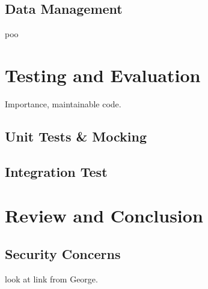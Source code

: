 \documentclass[a4paper, 11pt]{article}
\begin{document}
\subsection{Data Management}
poo

\clearpage


\section{Testing and Evaluation}
Importance, maintainable code.
\subsection{Unit Tests \& Mocking}
\subsection{Integration Test}

\section{Review and Conclusion}
\subsection{Security Concerns} look at link from George. 



\vspace{\baselineskip}
\vspace{\baselineskip}
\vspace{\baselineskip}
\end{document}
